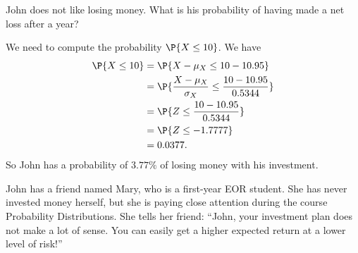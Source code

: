 \begin{exercise}
John does not like losing money. What is his probability of having made a net loss after a year?
\begin{solution}
We need to compute the probability $\P{X \leq 10}$. We have
\begin{align}
    \P{X \leq 10}
 &= \P{ X - \mu_X \leq 10 - 10.95} \\
    &= \P{ \frac{X - \mu_X}{\sigma_X} \leq \frac{10 - 10.95}{0.5344} } \\
    &= \P{ Z \leq \frac{10 - 10.95}{0.5344} } \\
    &= \P{ Z \leq -1.7777 } \\
    &= 0.0377.
\end{align}
So John has a probability of $3.77\%$ of losing money with his investment.
\end{solution}
\end{exercise}

John has a friend named Mary, who is a first-year EOR student. She has never invested money herself, but she is paying close attention during the course Probability Distributions. She tells her friend: ``John, your investment plan does not make a lot of sense. You can easily get a higher expected return at a lower level of risk!''

